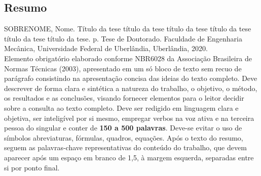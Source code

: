 \clearpage
\begin{center}
	\chapter*{Resumo}
\end{center}
\vspace{24pt}
\onehalfspacing
\noindent
SOBRENOME, Nome. Título da tese título da tese título da tese título da tese título da tese título da tese. \pageref{LastPage}p. Tese de Doutorado. Faculdade de Engenharia Mecânica, Universidade Federal de Uberlândia, Uberlândia, 2020.\\

Elemento obrigatório elaborado conforme NBR6028 da Associação Brasileira de Normas Técnicas (2003), apresentado em um só bloco de texto sem recuo de parágrafo consistindo na apresentação concisa das ideias do texto completo. Deve descrever de forma clara e sintética a natureza do trabalho, o objetivo, o método, os resultados e as conclusões, visando fornecer elementos para o leitor decidir sobre a consulta ao texto completo. Deve ser redigido em linguagem clara e objetiva, ser inteligível por si mesmo, empregar verbos na voz ativa e na terceira pessoa do singular e conter de \textbf{150 a 500 palavras}. Deve-se evitar o uso de símbolos abreviaturas, fórmulas, quadros, equações. Após o texto do resumo, seguem as palavras-chave representativas do conteúdo do trabalho, que devem aparecer após um espaço em branco de 1,5, à margem esquerda, separadas entre si por ponto final.
\\

